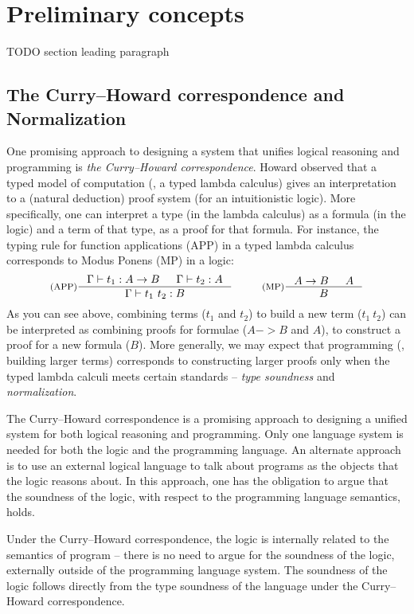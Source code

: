 \section{Preliminary concepts}\label{sec:intro:concepts}
TODO section leading paragraph

\subsection{The Curry--Howard correspondence and Normalization}
\label{sec:intro:concepts:CH}
One promising approach to designing a system that unifies
logical reasoning and programming is \emph{the Curry--Howard correspondence}.
Howard \cite{Howard69} observed that a typed model of computation
(\ie, a typed lambda calculus) gives an interpretation to a (natural deduction)
proof system (for an intuitionistic logic). More specifically, one can interpret
a type (in the lambda calculus) as a formula (in the logic) and
a term of that type, as a proof for that formula. For instance,
the typing rule for function applications (APP) in a typed lambda calculus
corresponds to Modus Ponens (MP) in a logic:
\[ \inference[(APP)]{\Gamma |- t_1 : A -> B & \Gamma |- t_2 : A}{
	\Gamma |- t_1~t_2 : B}
 ~~~~~~~~
   \inference[(MP)]{A -> B & A}{B}
\]
As you can see above, combining terms ($t_1$ and $t_2$) to build a new term
($t_1~t_2$) can be interpreted as combining proofs for formulae
($A -> B$ and $A$), to construct a proof for a new formula ($B$).
More generally, we may expect that programming (\ie, building larger terms)
corresponds to constructing larger proofs only when the typed lambda calculi
meets certain standards -- \emph{type soundness} and \emph{normalization}.

The Curry--Howard correspondence is a promising approach to designing a
unified system for both logical reasoning and programming. Only one language
system is needed for both the logic and the programming language. An
alternate approach is to use an external logical language to talk about
programs as the objects that the logic reasons about. In this approach, one
has the obligation to argue that the soundness of the logic, with respect to
the programming language semantics, holds.

Under the Curry--Howard correspondence, the logic is internally related to the
semantics of program -- there is no need to argue for the soundness of the
logic,  externally outside of the programming language system. The soundness
of the logic follows directly from the type soundness of the language under
the Curry--Howard correspondence.

